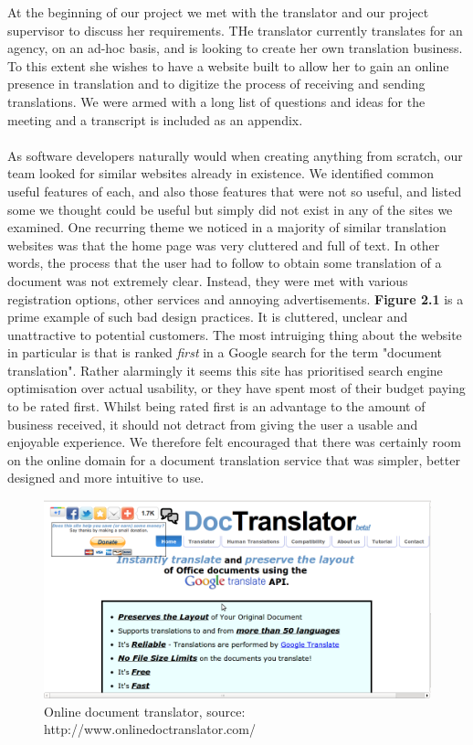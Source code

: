\documentclass{l3proj}
\begin{document}
At the beginning of our project we met with the translator and our project supervisor to discuss her requirements. THe translator currently translates for an agency, on an ad-hoc basis, and is looking to create her own translation business. To this extent she wishes to have a website built to allow her to gain an online presence in translation and to digitize the process of receiving and sending translations. We were armed with a long list of questions and ideas for the meeting and a transcript is included as an appendix.\\
\\
As software developers naturally would when creating anything from scratch, our team looked for similar websites already in existence. We identified common useful features of each, and also those features that were not so useful, and listed some we thought could be useful but simply did not exist in any of the sites we examined. One recurring theme we noticed in a majority of similar translation websites was that the home page was very cluttered and full of text. In other words, the process that the user had to follow to obtain some translation of a document was not extremely clear. Instead, they were met with various registration options, other services and annoying advertisements. \textbf{Figure 2.1} is a prime example of such bad design practices. It is cluttered, unclear and unattractive to potential customers. The most intruiging thing about the website in particular is that is ranked \textit{first} in a Google search for the term "document translation". Rather alarmingly it seems this site has prioritised search engine optimisation over actual usability, or they have spent most of their budget paying to be rated first. Whilst being rated first is an advantage to the amount of business received, it should not detract from giving the user a usable and enjoyable experience. We therefore felt encouraged that there was certainly room on the online domain for a document translation service that was simpler, better designed and more intuitive to use.

\begin{figure}
\begin{center}
\includegraphics[scale=0.4]{ex1doctrans}
\caption{Online document translator, source: http://www.onlinedoctranslator.com/}
\end{center}
\end{figure}
\end{document}
